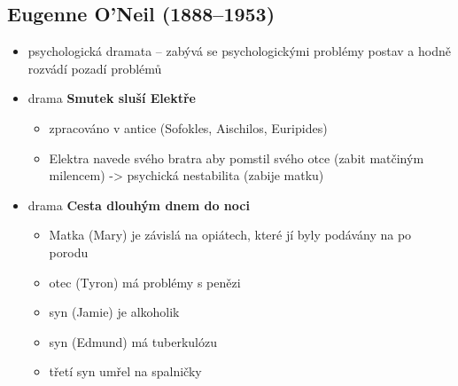 \subsection{Eugenne O'Neil (1888--1953)}
\begin{itemize}
\item psychologická dramata -- zabývá se psychologickými problémy postav a hodně rozvádí pozadí problémů
\item drama \textbf{Smutek sluší Elektře}
	\begin{itemize}
	\item zpracováno v antice (Sofokles, Aischilos, Euripides)
	\item Elektra navede svého bratra aby pomstil svého otce (zabit matčiným milencem) -> psychická nestabilita (zabije matku)
	\end{itemize}
\item drama \textbf{Cesta dlouhým dnem do noci}
	\begin{itemize}
	\item Matka (Mary) je závislá na opiátech, které jí byly podávány na po porodu
	\item otec (Tyron) má problémy s penězi
	\item syn (Jamie) je alkoholik
	\item syn (Edmund) má tuberkulózu
	\item třetí syn umřel na spalničky
	\end{itemize}
\end{itemize}

	

